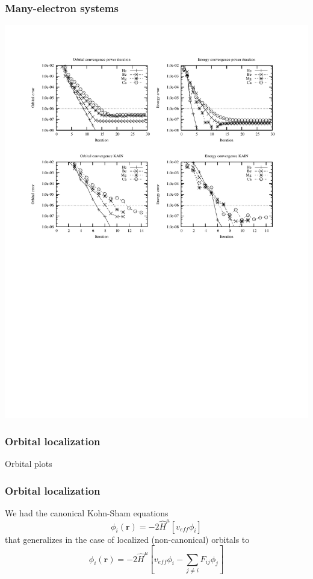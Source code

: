 \documentclass[mathserif]{beamer}
\begin{document}
\begin{frame}
    \frametitle{Many-electron systems}
    \begin{center}
	\includegraphics[scale=0.6, clip, viewport = 50 550 540 730]{figures/accuracy.pdf}
    \end{center}
\end{frame}

\begin{frame}
    \frametitle{Orbital localization}
    Orbital plots
\end{frame}

\begin{frame}
    \frametitle{Orbital localization}
    We had the canonical Kohn-Sham equations
    \begin{equation}
	\phi_i(\boldsymbol{r}) = -2\hat{H}^\mu\left[v_{eff}\phi_i\right] 
    \end{equation}
    that generalizes in the case of localized (non-canonical) orbitals to
    \begin{equation}
	\phi_i(\boldsymbol{r}) = 
	    -2\hat{H}^\mu\left[v_{eff}\phi_i-\sum_{j\neq i} F_{ij}\phi_j\right] 
    \end{equation}
\end{frame}
\end{document}
